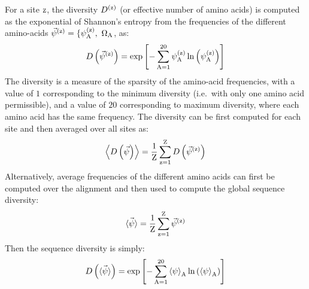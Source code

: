 For a site $\text{z}$, the diversity $D^{(\text{z})}$ (or effective number of amino acids) is computed as the exponential of Shannon's entropy from the frequencies of the different amino-acids $\Freq\siteexp = \{ \freq\siteexp_{\aminoacid},\ \SetAa$, as:
\begin{equation}
    D\left(\vec{\psi}^{(\text{z})}\right) = \exp \left[ - \sum\limits_{\text{A}=1}^{20} \psi^{(\text{z})}_{\text{A}} \ln \left( \psi^{(\text{z})}_{\text{A}} \right) \right]
    \label{eq:diversity-site-specific}
\end{equation}
The diversity is a measure of the sparsity of the amino-acid frequencies, with a value of $1$ corresponding to the minimum diversity (i.e.~with only one amino acid permissible), and a value of $20$ corresponding to maximum diversity, where each amino acid has the same frequency.
The diversity can be first computed for each site and then averaged over all sites as:
\begin{equation}
    \left\langle D\left(\vec{\psi}\right) \right\rangle = \dfrac{1}{\text{Z}}\sum\limits_{\text{z}=1}^{\text{Z}} D\left(\vec{\psi}^{(\text{z})}\right)
    \label{eq:diversity-site-specific-avg}
\end{equation}
Alternatively, average frequencies of the different amino acids can first be computed over the alignment and then used to compute the global sequence diversity:
\begin{equation}
    \vec{\left\langle \psi \right\rangle} = \dfrac{1}{\text{Z}}\sum\limits_{\text{z}=1}^{\text{Z}} \vec{\psi}^{(\text{z})}
    \label{eq:profile-gene-wise}
\end{equation}
Then the sequence diversity is simply:
\begin{equation}
    D \left(  \vec{\left\langle \psi \right\rangle} \right) = \exp \left[ - \sum\limits_{\text{A}=1}^{20} \left\langle \psi \right\rangle_{\text{A}} \ln \left( \left\langle \psi \right\rangle_{\text{A}} \right) \right]
    \label{eq:diversity-gene-wise}
\end{equation}

